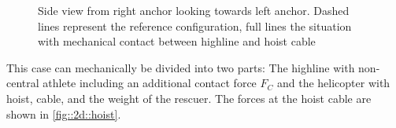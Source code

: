 \documentclass[a4paper,10pt]{scrartcl}
\begin{document}
\begin{figure}[ht]
\centering
{}
\caption{Side view from right anchor looking towards left anchor. Dashed lines represent the reference configuration, full lines the situation with mechanical contact between highline and hoist cable}
\label{fig::2d::highline_hoist}
\end{figure}

This case can mechanically be divided into two parts: The highline with non-central athlete including an additional contact force $F_C$ and the helicopter with hoist, cable, and the weight of the rescuer. The forces at the hoist cable are shown in \ref{fig::2d::hoist}.
\end{document}
